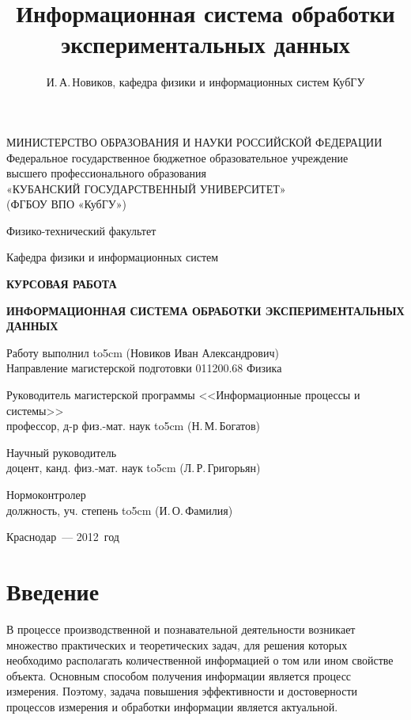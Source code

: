 \documentclass[a4paper, 14pt, titlepage]{extarticle}
\author{И.\,А.\,Новиков, кафедра физики и информационных систем КубГУ}
\title{Информационная система обработки экспериментальных данных}
\newcommand\sectiontoc[1]{\section*{#1}\addcontentsline{toc}{section}{#1}}
\newcommand{\underscore}[1]{\hbox to#1{\hrulefill}}
\begin{document}

  \thispagestyle{empty}
  \begin {center}
  МИНИСТЕРСТВО ОБРАЗОВАНИЯ И НАУКИ РОССИЙСКОЙ ФЕДЕРАЦИИ\\
  Федеральное государственное бюджетное образовательное учреждение\\
  высшего профессионального образования\\
  «КУБАНСКИЙ ГОСУДАРСТВЕННЫЙ УНИВЕРСИТЕТ»\\
  (ФГБОУ ВПО «КубГУ»)

  Физико-технический факультет

  \vspace {1cm}

  Кафедра физики и информационных систем

  \vspace {3.5cm}

  \textbf{КУРСОВАЯ РАБОТА}

  \vspace {0.5cm}

  \textbf{ИНФОРМАЦИОННАЯ СИСТЕМА ОБРАБОТКИ ЭКСПЕРИМЕНТАЛЬНЫХ ДАННЫХ}

  \vspace {1.5cm}

  \begin{flushleft}
    Работу выполнил \underscore{5cm} (Новиков Иван Александрович)\\
    Направление магистерской подготовки 011200.68 Физика

    Руководитель магистерской программы <<Информационные процессы и системы>>\\
    профессор, д-р физ.-мат. наук \underscore{5cm} (Н.\,М.\,Богатов)

    Научный руководитель\\
    доцент, канд. физ.-мат. наук \underscore{5cm} (Л.\,Р.\,Григорьян)

    Нормоконтролер\\
    должность, уч. степень \underscore{5cm} (И.\,О.\,Фамилия)
  \end{flushleft}

  \vspace {2cm}

  Краснодар~--- 2012~год
  \end {center}


  \tableofcontents

  \sectiontoc{Введение}

  В процессе производственной и познавательной деятельности возникает множество практических и
  теоретических задач, для решения которых необходимо располагать количественной информацией о том
  или ином свойстве объекта. Основным способом получения информации является процесс измерения.
  Поэтому, задача повышения эффективности и достоверности процессов измерения и обработки информации
  является актуальной.
\end{document}
